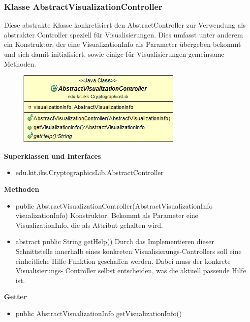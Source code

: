 \documentclass{article}
\begin{document}
	\subsubsection{Klasse AbstractVisualizationController}
	  Diese abstrakte Klasse konkretisiert den AbstractController zur Verwendung als
	  abstrakter Controller speziell für Visualisierungen. Dies umfasst unter anderem
	  ein Konstruktor, der eine VisualizationInfo als Parameter übergeben bekommt und
	  sich damit initialisiert, sowie einige für Visualisierungen gemeinsame Methoden.
	
      \begin{figure}[H]
        \centering
        \includegraphics{resources/edu-kit-iks-CryptographicsLib-AbstractVisualizationController}
      \end{figure}
	
      \textbf{Superklassen und Interfaces}
      \begin{itemize}
        \item edu.kit.iks.CryptographicsLib.AbstractController
      \end{itemize}
	
      \textbf{Methoden}
      \begin{itemize}
        \item public AbstractVisualizationController(AbstractVisualizationInfo visualizationInfo) \newline
          Konstruktor. Bekommt als Parameter eine VisualizationInfo, die als Attribut gehalten wird.
        \item abstract public String getHelp() \newline
          Durch das Implementieren dieser Schnittstelle innerhalb eines konkreten Visualisierungs-Controllers
          soll eine einheitliche Hilfe-Funktion geschaffen werden. Dabei muss der konkrete Visualisierungs-
          Controller selbst entscheiden, was die aktuell passende Hilfe ist.
      \end{itemize}
      
      \textbf{Getter}
      \begin{itemize}
		\item public AbstractVisualizationInfo getVisualizationInfo()
      \end{itemize}
      
\end{document}
